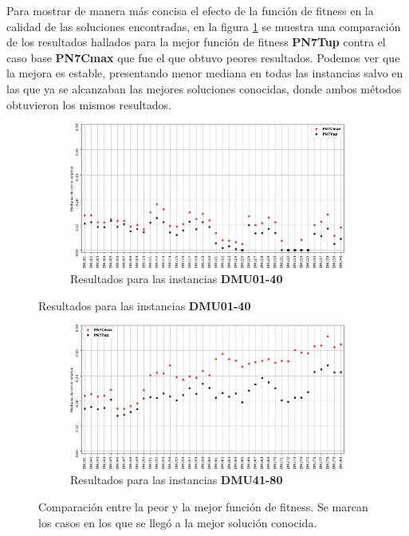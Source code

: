 Para mostrar de manera más concisa el efecto de la función de fitness en la calidad de las soluciones encontradas, en la figura \ref{fig:PN7CmaxvsPN7Tup} se muestra una comparación de los resultados hallados para la mejor función de fitness \textbf{PN7Tup} contra el caso base \textbf{PN7Cmax} que fue el que obtuvo peores resultados.
%
Podemos ver que la mejora es estable, presentando menor mediana en todas las instancias salvo en las que ya se alcanzaban las mejores soluciones conocidas,
donde ambos métodos obtuvieron los mismos resultados.


\begin{figure}[hbtp]
    \begin{subfigure}{\textwidth}
        \centering
        \includegraphics[scale=.65]{Imagenes/PN7CmaxvsPN7Tup_1.png}
        \caption{Resultados para las instancias \textbf{DMU01-40}}
    \end{subfigure}
\end{figure}
\begin{figure}[H]\ContinuedFloat
    \begin{subfigure}{\textwidth}
        \centering
        \includegraphics[scale=.65]{Imagenes/PN7CmaxvsPN7Tup_2.png}
        \caption{Resultados para las instancias \textbf{DMU41-80}}
    \end{subfigure}
    \caption{Comparación entre la peor y la mejor función de fitness. Se marcan los casos en los que se llegó a la mejor solución conocida.}
    \label{fig:PN7CmaxvsPN7Tup}
\end{figure}


